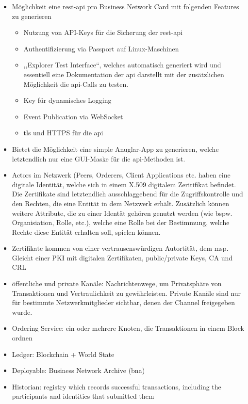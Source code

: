         \begin{itemize}[noitemsep]
            \item Möglichkeit eine \gls{rest}-\gls{api} pro Business Network Card mit folgenden Features zu generieren
                \begin{itemize}[noitemsep]
                    \item Nutzung von API-Keys für die Sicherung der \gls{rest}-\gls{api}
                    \item Authentifizierung via Passport auf Linux-Maschinen
                    \item ,,Explorer Test Interface``, welches automatisch generiert wird und essentiell eine Dokumentation der \gls{api} darstellt mit der zusätzlichen Möglichkeit die \gls{api}-Calls zu testen.
                    \item Key für dynamisches Logging
                    \item Event Publication via WebSocket
                    \item \gls{tls} und HTTPS für die \gls{api}
                \end{itemize}
            \item Bietet die Möglichkeit eine simple Anuglar-App zu generieren, welche letztendlich nur eine GUI-Maske für die \gls{api}-Methoden ist.
            \item Actors im Netzwerk (Peers, Orderers, Client Applications etc. haben eine digitale Identität, welche sich in einem X.509 digitalem Zeritifikat befindet.
                Die Zertifikate sind letztendlich ausschlaggebend für die Zugriffskontrolle und den Rechten, die eine Entität in dem Netzwerk erhält. 
                Zusätzlich können weitere Attribute, die zu einer Identät gehören genutzt werden (wie bspw. Organisiation, Rolle, etc.), welche eine Rolle bei der Bestimmung, welche Rechte diese Entität erhalten soll, spielen können.
            \item Zertifikate kommen von einer vertrausenswürdigen Autortität, dem \gls{msp}. 
                Gleicht einer PKI mit digitalen Zertifikaten, public/\-private Keys, CA und CRL
            \item öffentliche und private Kanäle: Nachrichtenwege, um Privatsphäre von Transaktionen und Vertraulichkeit zu gewährleisten.
                Private Kanäle sind nur für bestimmte Netzwerkmitglieder sichtbar, denen der Channel freigegeben wurde.
            \item Ordering Service: ein oder mehrere Knoten, die Transaktionen in einem Block ordnen
            \item Ledger: Blockchain + World State
            \item Deployable: Business Network Archive (bna)
            \item Historian: registry which records successful transactions, including the participants and identities that submitted them
        \end{itemize}
        

